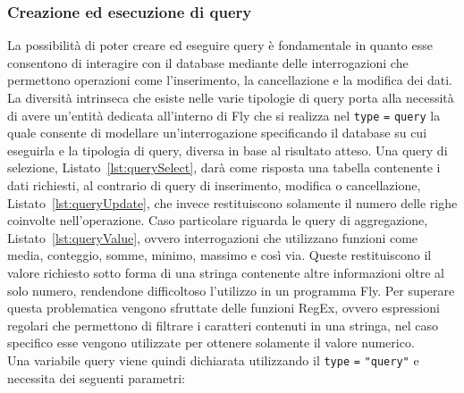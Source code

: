 \subsubsection{Creazione ed esecuzione di query}
La possibilità di poter creare ed eseguire query è fondamentale in quanto esse consentono di interagire con il database mediante delle interrogazioni che permettono operazioni come l'inserimento, la cancellazione e la modifica dei dati. La diversità intrinseca che esiste nelle varie tipologie di query porta alla necessità di avere un'entità dedicata all'interno di Fly che si realizza nel \verb|type| \verb|=| \verb|query| la quale consente di modellare un'interrogazione specificando il database su cui eseguirla e la tipologia di query, diversa in base al risultato atteso. Una query di selezione, Listato~\ref{lst:querySelect}, darà come risposta una tabella contenente i dati richiesti, al contrario di query di inserimento, modifica o cancellazione, Listato~\ref{lst:queryUpdate}, che invece restituiscono solamente il numero delle righe coinvolte nell'operazione. Caso particolare riguarda le query di aggregazione, Listato~\ref{lst:queryValue}, ovvero interrogazioni che utilizzano funzioni come media, conteggio, somme, minimo, massimo e così via. Queste restituiscono il valore richiesto sotto forma di una stringa contenente altre informazioni oltre al solo numero, rendendone difficoltoso l'utilizzo in un programma Fly. Per superare questa problematica vengono sfruttate delle funzioni RegEx, ovvero espressioni regolari che permettono di filtrare i caratteri contenuti in una stringa, nel caso specifico esse vengono utilizzate per ottenere solamente il valore numerico.\\
Una variabile query viene quindi dichiarata utilizzando il \verb|type| \verb|=| \verb|"query"| e necessita dei seguenti parametri:

